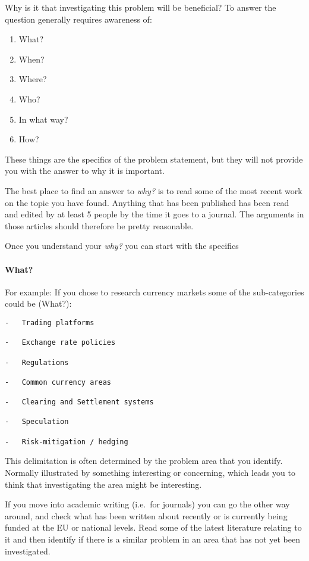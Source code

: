 \documentclass[10pt,twoside]{article}
\providecommand{\tightlist}{%
  \setlength{\itemsep}{0pt}\setlength{\parskip}{0pt}}
\let\oldparagraph\paragraph
\renewcommand{\paragraph}[1]{\oldparagraph{#1}\mbox{}}
\begin{document}
Why is it that investigating this problem will be beneficial? To answer
the question generally requires awareness of:

\begin{enumerate}
\def\labelenumi{\arabic{enumi}.}
\tightlist
\item
  What?
\item
  When?
\item
  Where?
\item
  Who?
\item
  In what way?
\item
  How?
\end{enumerate}

These things are the specifics of the problem statement, but they will
not provide you with the answer to why it is important.

The best place to find an answer to \emph{why?} is to read some of the
most recent work on the topic you have found. Anything that has been
published has been read and edited by at least 5 people by the time it
goes to a journal. The arguments in those articles should therefore be
pretty reasonable.

Once you understand your \emph{why?} you can start with the specifics

\hypertarget{what}{%
\paragraph{What?}\label{what}}

For example: If you chose to research currency markets some of the
sub-categories could be (What?):

\begin{verbatim}
-   Trading platforms

-   Exchange rate policies

-   Regulations

-   Common currency areas

-   Clearing and Settlement systems

-   Speculation

-   Risk-mitigation / hedging
\end{verbatim}

This delimitation is often determined by the problem area that you
identify. Normally illustrated by something interesting or concerning,
which leads you to think that investigating the area might be
interesting.

If you move into academic writing (i.e.~for journals) you can go the
other way around, and check what has been written about recently or is
currently being funded at the EU or national levels. Read some of the
latest literature relating to it and then identify if there is a similar
problem in an area that has not yet been investigated.
\end{document}

